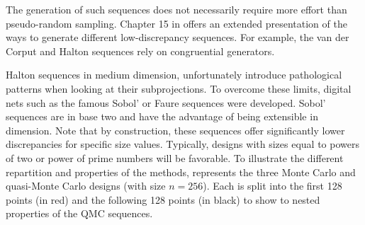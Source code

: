 
The generation of such sequences does not necessarily require more effort than pseudo-random sampling. 
Chapter 15 in \citet{owen_2013} offers an extended presentation of the ways to generate different low-discrepancy sequences. 
For example, the van der Corput and Halton sequences rely on congruential generators. 

Halton sequences in medium dimension, unfortunately introduce pathological patterns when looking at their subprojections. 
To overcome these limits, digital nets such as the famous Sobol' or Faure sequences were developed.  
Sobol' sequences are in base two and have the advantage of being extensible in dimension. 
Note that by construction, these sequences offer significantly lower discrepancies for specific size values. 
Typically, designs with sizes equal to powers of two or power of prime numbers will be favorable. 
To illustrate the different repartition and properties of the methods,  represents the three Monte Carlo and quasi-Monte Carlo designs (with size $n=256$). 
Each is split into the first 128 points (in red) and the following 128 points (in black) to show to nested properties of the QMC sequences. 


